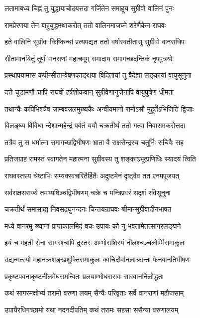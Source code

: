 \twolineshloka
{लतामाबध्य चिह्नं तु युद्धायाचोदयत्तदा}
{गर्जितेन समाहूय सुग्रीवो वालिनं पुनः}%

\twolineshloka
{रामप्रेरणया तेन बाहुयुद्धमथाकरोत्}
{ततो वालिनमाजघ्ने शरेणैकेन राघवः}%

\twolineshloka
{हते वालिनि सुग्रीवः किष्किन्धां प्रत्यपद्यत}
{ततो वर्षास्वतीतासु सुग्रीवो वानराधिपः}%

\twolineshloka
{सीतामानयितुं तूर्णं वानराणां महाचमूम्}
{समादाय समागच्छदन्तिकं नृपपुत्रयोः}%

\twolineshloka
{प्रस्थापयामास कपीन्सीतान्वेषणकाङ्क्षया}
{विदितायां तु वैदेह्या लङ्कायां वायुसूनुना}%

\twolineshloka
{दत्ते चूडामणौ चापि राघवो हर्षशोकवान्}
{सुग्रीवेणानुजेनापि वायुपुत्रेण धीमता}%

\twolineshloka
{तथान्यैः कपिभिश्चैव जाम्बवन्नलमुख्यकैः}
{अन्वीयमानो रामोऽसौ मुहूर्तेऽभिजिति द्विजाः}%

\twolineshloka
{विलङ्घ्य विविधा न्देशान्महेन्द्रं पर्वतं ययौ}
{चक्रतीर्थं ततो गत्वा निवासमकरोत्तदा}%

\twolineshloka
{तत्रैव तु स धर्मात्मा समागच्छद्विभीषणः}
{भ्राता वै राक्षसेन्द्रस्य चतुर्भिः सचिवैः सह}%

\twolineshloka
{प्रतिजग्राह रामस्तं स्वागतेन महात्मना}
{सुग्रीवस्य तु शङ्काऽभूत्प्रणिधिः स्यादयं त्विति}%

\twolineshloka
{राघवस्तस्य चेष्टाभिः सम्यक्स्वचरितैर्हितैः}
{अदुष्टमेनं दृष्ट्वैव तत एनमपूजयत्}%

\twolineshloka
{सर्वराक्षसराज्ये तमभ्यषिञ्चद्विभीषणम्}
{चक्रे च मन्त्रिप्रवरं सदृशं रविसूनुना}%

\twolineshloka
{चक्रतीर्थं समासाद्य निवसद्रघुनन्दनः}
{चिन्तयन्राघवः श्रीमान्सुग्रीवादीनभाषत}%

\twolineshloka
{मध्ये वानरमु ख्यानां प्राप्तकालमिदं वचः}
{उपायः को नु भवतामेतत्सागरलङ्घने}%

\twolineshloka
{इयं च महती सेना सागरश्चापि दुस्तरः}
{अम्भोराशिरयं नीलश्चञ्चलोर्म्मिसमाकुलः}%

\twolineshloka
{उद्यन्मत्स्यो महानक्रशङ्खशुक्तिसमाकुलः}
{क्वचिदौर्वानलाक्रान्तः फेनवानतिभीषणः}%

\twolineshloka
{प्रकृष्टपवनाकृष्टनीलमेघसमन्वितः}
{प्रलयाम्भोधरारावः सारवाननिलोद्धतः}%

\twolineshloka
{कथं सागरमक्षोभ्यं तरामो वरुणा लयम्}
{सैन्यैः परिवृताः सर्वे वानराणां महौजसाम्}%

\twolineshloka
{उपायैरधिगच्छामो यथा नदनदीपतिम्}
{कथं तरामः सहसा ससैन्या वरुणालयम्}%

